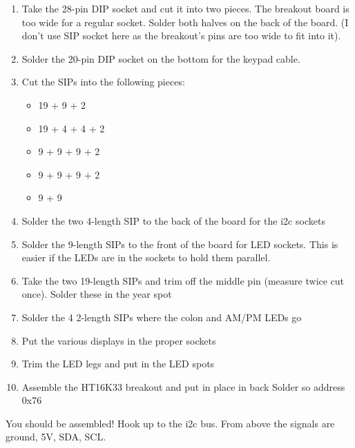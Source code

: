 \documentclass[11pt]{article}
\begin{document}
\begin{enumerate}
\item Take the 28-pin DIP socket and cut it into two pieces.
      The breakout board is too wide for a regular socket.
      Solder both halves on the back of the board.
      (I don't use SIP socket here as the breakout's pins are too
       wide to fit into it).
\item Solder the 20-pin DIP socket on the bottom for the
      keypad cable.
\item Cut the SIPs into the following pieces:
\begin{itemize}
\item 19 + 9 + 2
\item 19 + 4 + 4 + 2
\item 9 + 9 + 9 + 2
\item 9 + 9 + 9 + 2
\item 9 + 9
\end{itemize}
\item Solder the two 4-length SIP to the back of the board
      for the i2c sockets
\item Solder the 9-length SIPs to the front of the board for LED
      sockets.  This is easier if the LEDs are in the sockets to
      hold them parallel.
\item Take the two 19-length SIPs and trim off the middle pin
      (measure twice cut once).  Solder these in the year spot
\item Solder the 4 2-length SIPs where the colon and AM/PM LEDs go
\item Put the various displays in the proper sockets
\item Trim the LED legs and put in the LED spots
\item Assemble the HT16K33 breakout and put in place in back
      Solder so address 0x76
\end{enumerate}

You should be assembled!  Hook up to the i2c bus.  From above
the signals are ground, 5V, SDA, SCL.
\end{document}
